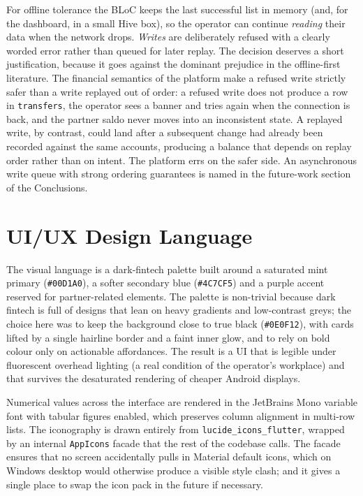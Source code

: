 For offline tolerance the BLoC keeps the last successful list in memory (and, for the dashboard, in a small Hive box), so the operator can continue \emph{reading} their data when the network drops. \emph{Writes} are deliberately refused with a clearly worded error rather than queued for later replay. The decision deserves a short justification, because it goes against the dominant prejudice in the offline-first literature. The financial semantics of the platform make a refused write strictly safer than a write replayed out of order: a refused write does not produce a row in \texttt{transfers}, the operator sees a banner and tries again when the connection is back, and the partner saldo never moves into an inconsistent state. A replayed write, by contrast, could land after a subsequent change had already been recorded against the same accounts, producing a balance that depends on replay order rather than on intent. The platform errs on the safer side. An asynchronous write queue with strong ordering guarantees is named in the future-work section of the Conclusions.

\section{UI/UX Design Language}
\label{sec:design}

The visual language is a dark-fintech palette built around a saturated mint primary (\texttt{\#00D1A0}), a softer secondary blue (\texttt{\#4C7CF5}) and a purple accent reserved for partner-related elements. The palette is non-trivial because dark fintech is full of designs that lean on heavy gradients and low-contrast greys; the choice here was to keep the background close to true black (\texttt{\#0E0F12}), with cards lifted by a single hairline border and a faint inner glow, and to rely on bold colour only on actionable affordances. The result is a UI that is legible under fluorescent overhead lighting (a real condition of the operator's workplace) and that survives the desaturated rendering of cheaper Android displays.

Numerical values across the interface are rendered in the JetBrains Mono variable font with tabular figures enabled, which preserves column alignment in multi-row lists. The iconography is drawn entirely from \texttt{lucide\_icons\_flutter}, wrapped by an internal \texttt{AppIcons} facade that the rest of the codebase calls. The facade ensures that no screen accidentally pulls in Material default icons, which on Windows desktop would otherwise produce a visible style clash; and it gives a single place to swap the icon pack in the future if necessary.

